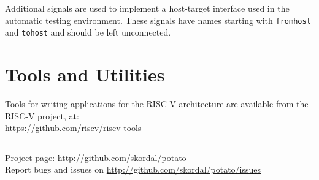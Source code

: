 \documentclass[10pt,a4paper]{article}
\begin{document}
\begin{minipage}[t]{0.48\textwidth}
Additional signals are used to implement a host-target interface used in the automatic testing
environment. These signals have names starting with \texttt{fromhost} and \texttt{tohost} and
should be left unconnected.\\

\section{Tools and Utilities}

Tools for writing applications for the RISC-V architecture are available from the
RISC-V project, at:\\[1em]
\url{https://github.com/riscv/riscv-tools}\\

\end{minipage}

\vfill
\noindent\rule{\linewidth}{1pt}
{\small
Project page: \url{http://github.com/skordal/potato}\\
Report bugs and issues on \url{http://github.com/skordal/potato/issues}}
\end{document}
